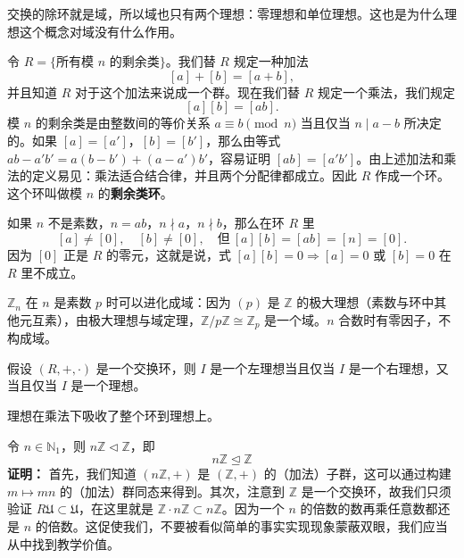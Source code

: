 \begin{note}[定理1除环只有两个理想]
交换的除环就是域，所以域也只有两个理想：零理想和单位理想。这也是为什么理想这个概念对域没有什么作用。
\end{note}

\begin{example}
令 $R=\{\text{所有模 }n\text{ 的剩余类}\}$。我们替 $R$ 规定一种加法
\[
[a]+[b]=[a+b],
\]
并且知道 $R$ 对于这个加法来说成一个群。现在我们替 $R$ 规定一个乘法，我们规定
\[
[a][b]=[ab].
\]
模 $n$ 的剩余类是由整数间的等价关系 $a\equiv b\pmod{n}$ 当且仅当 $n\mid a-b$ 所决定的。如果 $[a]=[a']$，$[b]=[b']$，那么由等式 $ab-a'b'=a(b-b')+(a-a')b'$，容易证明 $[ab]=[a'b']$。由上述加法和乘法的定义易见：乘法适合结合律，并且两个分配律都成立。因此 $R$ 作成一个环。这个环叫做模 $n$ 的\textbf{剩余类环}。

如果 $n$ 不是素数，$n=ab$，$n\nmid a$，$n\nmid b$，那么在环 $R$ 里
\[
[a]\ne[0],\quad[b]\ne[0],\quad\text{但}\ [a][b]=[ab]=[n]=[0].
\]
因为 $[0]$ 正是 $R$ 的零元，这就是说，式 $[a][b]=0\Rightarrow[a]=0$ 或 $[b]=0$ 在 $R$ 里不成立。
\end{example}

\begin{note}[剩余类环进化成域]
$\mathbb{Z}_n$ 在 $n$ 是素数 $p$ 时可以进化成域：因为 $(p)$ 是 $\mathbb{Z}$ 的极大理想（素数与环中其他元互素），由极大理想与域定理，$\mathbb{Z}/p\mathbb{Z}\cong\mathbb{Z}_p$ 是一个域。$n$ 合数时有零因子，不构成域。
\end{note}

\begin{proposition}
假设 $(R,+,\cdot)$ 是一个交换环，则 $I$ 是一个左理想当且仅当 $I$ 是一个右理想，又当且仅当 $I$ 是一个理想。

理想在乘法下吸收了整个环到理想上。
\end{proposition}

\begin{proposition}[命题 2.7：整环乘整数都是理想]
令 $n\in\mathbb{N}_1$，则 $n\mathbb{Z}\triangleleft\mathbb{Z}$，即
\[
n\mathbb{Z}\trianglelefteq\mathbb{Z}
\]
\textbf{证明：} 首先，我们知道 $(n\mathbb{Z},+)$ 是 $(\mathbb{Z},+)$ 的（加法）子群，这可以通过构建 $m\mapsto mn$ 的（加法）群同态来得到。其次，注意到 $\mathbb{Z}$ 是一个交换环，故我们只须验证 $R\mathfrak{U}\subset\mathfrak{U}$，在这里就是 $\mathbb{Z}\cdot n\mathbb{Z}\subset n\mathbb{Z}$。因为一个 $n$ 的倍数的数再乘任意数都还是 $n$ 的倍数。这促使我们，不要被看似简单的事实实现现象蒙蔽双眼，我们应当从中找到教学价值。
\end{proposition}

